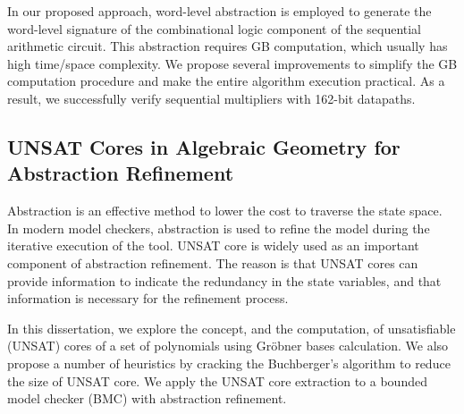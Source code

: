 In our proposed approach, word-level abstraction is employed to generate the 
word-level signature of the combinational logic component of the sequential 
arithmetic circuit. This abstraction requires GB computation, which usually has high time/space 
complexity. We propose several improvements to simplify the GB computation procedure
and make the entire algorithm execution practical. As a result, we successfully verify sequential 
multipliers with 162-bit datapaths.

\subsection{UNSAT Cores in Algebraic Geometry for Abstraction Refinement}
Abstraction is an effective method to lower the cost to traverse the state space.
In modern model checkers, abstraction is used to refine the model 
during the iterative execution of the tool. UNSAT core is widely used 
as an important component of abstraction refinement. The reason is that UNSAT cores can provide 
information to indicate the redundancy in the state variables, and that information is necessary for the refinement 
process. 

In this dissertation, we explore the concept, and the computation, of unsatisfiable (UNSAT)
  cores of  a set of polynomials using Gr\"obner bases calculation. We also propose
a number of heuristics by cracking the Buchberger's algorithm to reduce the size of UNSAT core. 
  We apply the UNSAT core extraction 
  to a bounded model checker (BMC) with abstraction refinement.


